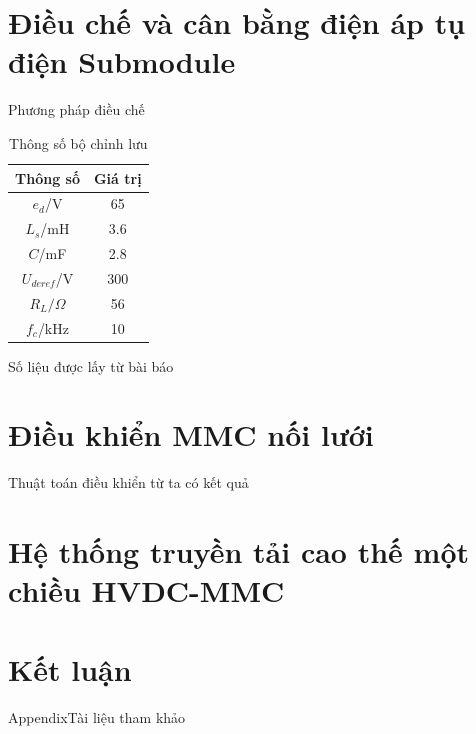 \documentclass[aspectratio=169,t,10pt]{beamer} %
\begin{document}
\section{Điều chế và cân bằng điện áp tụ điện Submodule}
\begin{frame}{Phương pháp điều chế}
       
       \begin{table}[]
           \centering
           \begin{tabular}{|c|c|}
           \hline
              Thông số  & Giá trị \\
              \hline
              $e_d$/V  &  65\\
              \hline
              $L_s$/mH  & 3.6 \\
              \hline
               $C$/mF  &  2.8\\
               \hline
              $U_{deref}$/V  & 300 \\
              \hline
               $R_L/\Omega$  &  56 \\
               \hline
              $f_c$/kHz  & 10 \\
              \hline
           \end{tabular}
           \caption{Thông số bộ chỉnh lưu}
           \label{tab1}
       \end{table}
       Số liệu được lấy từ bài báo \cite{he2018modeling}
       
 \end{frame}
\section{Điều khiển MMC nối lưới}
\begin{frame}{Thuật toán điều khiển}
    từ \cite{vaswani2017attention} ta có kết quả
\end{frame}
\section{Hệ thống truyền tải cao thế một chiều HVDC-MMC}
\section{Kết luận}



\begin{hpcaappendixframe}{Appendix}{Tài liệu tham khảo}   %

 
 


\end{hpcaappendixframe}
\end{document}
